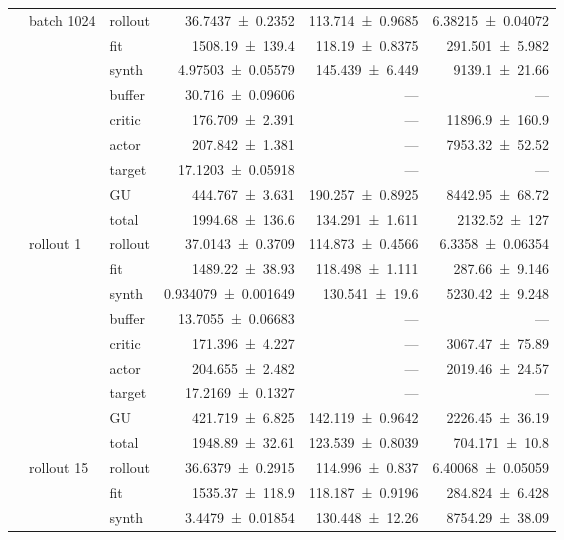 {\begin{longtable}{@{}lllrrr@{}}
    \addlinespace[2pt]
     & batch 1024 & rollout & \num{36.7437+-0.2352} & \num{113.714+-0.9685} & \num{6.38215+-0.04072} \\
     &  & fit & \num{1508.19+-139.4} & \num{118.19+-0.8375} & \num{291.501+-5.982} \\
     &  & synth & \num{4.97503+-0.05579} & \num{145.439+-6.449} & \num{9139.1+-21.66} \\
     &  & buffer & \num{30.716+-0.09606} & --- & --- \\
     &  & critic & \num{176.709+-2.391} & --- & \num{11896.9+-160.9} \\
     &  & actor & \num{207.842+-1.381} & --- & \num{7953.32+-52.52} \\
     &  & target & \num{17.1203+-0.05918} & --- & --- \\
     &  & GU & \num{444.767+-3.631} & \num{190.257+-0.8925} & \num{8442.95+-68.72} \\
     &  & total & \num{1994.68+-136.6} & \num{134.291+-1.611} & \num{2132.52+-127} \\
    \addlinespace[2pt]
     & rollout 1 & rollout & \num{37.0143+-0.3709} & \num{114.873+-0.4566} & \num{6.3358+-0.06354} \\
     &  & fit & \num{1489.22+-38.93} & \num{118.498+-1.111} & \num{287.66+-9.146} \\
     &  & synth & \num{0.934079+-0.001649} & \num{130.541+-19.6} & \num{5230.42+-9.248} \\
     &  & buffer & \num{13.7055+-0.06683} & --- & --- \\
     &  & critic & \num{171.396+-4.227} & --- & \num{3067.47+-75.89} \\
     &  & actor & \num{204.655+-2.482} & --- & \num{2019.46+-24.57} \\
     &  & target & \num{17.2169+-0.1327} & --- & --- \\
     &  & GU & \num{421.719+-6.825} & \num{142.119+-0.9642} & \num{2226.45+-36.19} \\
     &  & total & \num{1948.89+-32.61} & \num{123.539+-0.8039} & \num{704.171+-10.8} \\
    \addlinespace[2pt]
     & rollout 15 & rollout & \num{36.6379+-0.2915} & \num{114.996+-0.837} & \num{6.40068+-0.05059} \\
     &  & fit & \num{1535.37+-118.9} & \num{118.187+-0.9196} & \num{284.824+-6.428} \\
     &  & synth & \num{3.4479+-0.01854} & \num{130.448+-12.26} & \num{8754.29+-38.09} \\

\end{longtable}}

